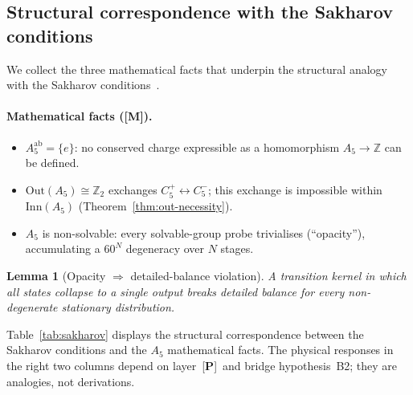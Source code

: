 \documentclass[sn-mathphys-num,Numbered]{sn-jnl}
\theoremstyle{thmstyleone}
\newtheorem{lemma}[theorem]{Lemma}
\theoremstyle{thmstylethree}
\theoremstyle{thmstyletwo}
\newcommand{\tagM}{[\textbf{M}]}
\newcommand{\tagP}{[\textbf{P}]}
\begin{document}
\subsection{Structural correspondence with the Sakharov conditions}
\label{ssec:sakharov}

We collect the three mathematical facts that underpin the structural
analogy with the Sakharov conditions~\cite{Sakharov1967}.

\paragraph{Mathematical facts (\tagM).}
\begin{itemize}
  \item[(M1)] $A_5^{\mathrm{ab}} = \{e\}$: no conserved charge
    expressible as a homomorphism $A_5 \to \mathbb{Z}$ can be defined.
  \item[(M2)] $\mathrm{Out}(A_5) \cong \mathbb{Z}_2$ exchanges
    $C_5^+ \leftrightarrow C_5^-$; this exchange is impossible within
    $\mathrm{Inn}(A_5)$ (Theorem~\ref{thm:out-necessity}).
  \item[(M3)] $A_5$ is non-solvable: every solvable-group probe
    trivialises (``opacity''), accumulating a $60^N$ degeneracy
    over $N$ stages.
\end{itemize}

\begin{lemma}[Opacity $\Rightarrow$ detailed-balance violation]
\label{lem:opacity}
A transition kernel in which all states collapse to a single output
breaks detailed balance for every non-degenerate stationary
distribution.
\end{lemma}

Table~\ref{tab:sakharov} displays the structural correspondence between
the Sakharov conditions and the $A_5$ mathematical facts.  The
physical responses in the right two columns depend on layer~\tagP\ and
bridge hypothesis~B2; they are analogies, not derivations.
\end{document}
